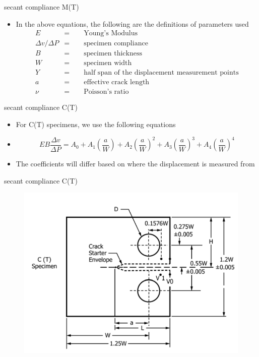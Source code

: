 \documentclass[10pt]{beamer}
\begin{document}
\begin{frame}{secant compliance M(T)}
	\begin{itemize}
		\item In the above equations, the following are the definitions of parameters used
		\begin{align*}
		E &= \qquad \text{Young's Modulus}\\
		\Delta v / \Delta P &= \qquad \text{specimen compliance}\\
		B &= \qquad \text{specimen thickness}\\
		W &= \qquad \text{specimen width}\\
		Y &= \qquad \text{half span of the displacement measurement points}\\
		a &= \qquad \text{effective crack length}\\
		\nu &= \qquad \text{Poisson's ratio}
		\end{align*}
	\end{itemize}
\end{frame}

\begin{frame}{secant compliance C(T)}
	\begin{itemize}[<+->]
		\item For C(T) specimens, we use the following equations
		\item[]
		\begin{equation}
		EB\frac{\Delta v}{\Delta P} = A_0 + A_1\left(\frac{a}{W}\right) + A_2\left(\frac{a}{W}\right)^2 + A_3\left(\frac{a}{W}\right)^3 + A_4\left(\frac{a}{W}\right)^4
		\end{equation}
		\item The coefficients will differ based on where the displacement is measured from
	\end{itemize}
\end{frame}

\begin{frame}{secant compliance C(T)}
\begin{figure}
\centering
\includegraphics[width=0.7\linewidth]{CT-KR}
\label{fig:CT-KR}
\end{figure}
\end{frame}
\end{document}
